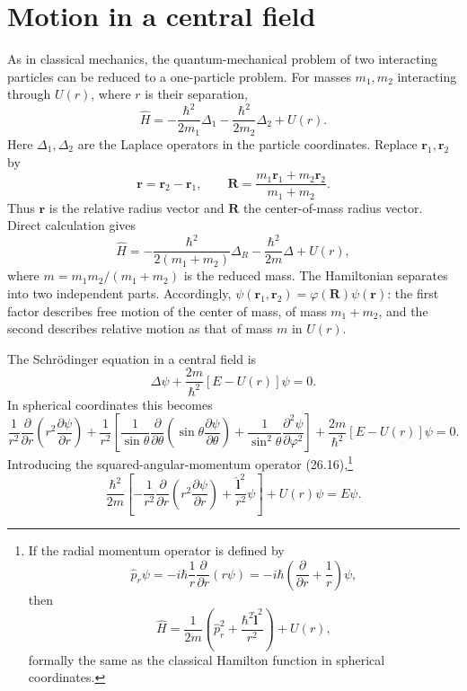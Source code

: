\section{Motion in a central field}

As in classical mechanics, the quantum-mechanical problem of two interacting
particles can be reduced to a one-particle problem. For masses $m_1,m_2$
interacting through $U(r)$, where $r$ is their separation,
\begin{equation}
 \hat H=-\frac{\hbar^2}{2m_1}\Delta_1-\frac{\hbar^2}{2m_2}\Delta_2+U(r).
 \tag{32.1}
\end{equation}
Here $\Delta_1,\Delta_2$ are the Laplace operators in the particle
coordinates. Replace $\mathbf r_1,\mathbf r_2$ by
\begin{equation}
 \mathbf r=\mathbf r_2-\mathbf r_1,\qquad
 \mathbf R=\frac{m_1\mathbf r_1+m_2\mathbf r_2}{m_1+m_2}.
 \tag{32.2}
\end{equation}
Thus $\mathbf r$ is the relative radius vector and $\mathbf R$ the
center-of-mass radius vector. Direct calculation gives
\begin{equation}
 \hat H=-\frac{\hbar^2}{2(m_1+m_2)}\Delta_R-\frac{\hbar^2}{2m}\Delta+U(r),
 \tag{32.3}
\end{equation}
where $m=m_1m_2/(m_1+m_2)$ is the reduced mass. The Hamiltonian separates
into two independent parts. Accordingly,
$\psi(\mathbf r_1,\mathbf r_2)=\varphi(\mathbf R)\psi(\mathbf r)$: the first
factor describes free motion of the center of mass, of mass $m_1+m_2$, and
the second describes relative motion as that of mass $m$ in $U(r)$.

The Schrödinger equation in a central field is
\begin{equation}
 \Delta\psi+\frac{2m}{\hbar^2}[E-U(r)]\psi=0.\tag{32.4}
\end{equation}
In spherical coordinates this becomes
\begin{equation}
 \frac1{r^2}\frac\partial{\partial r}\left(r^2\frac{\partial\psi}{\partial r}\right)
 +\frac1{r^2}\left[\frac1{\sin\theta}\frac\partial{\partial\theta}
 \left(\sin\theta\frac{\partial\psi}{\partial\theta}\right)
 +\frac1{\sin^2\theta}\frac{\partial^2\psi}{\partial\varphi^2}\right]
 +\frac{2m}{\hbar^2}[E-U(r)]\psi=0.\tag{32.5}
\end{equation}
Introducing the squared-angular-momentum operator (26.16),\footnote{If the
radial momentum operator is defined by
\[
 \hat p_r\psi=-i\hbar\frac1r\frac\partial{\partial r}(r\psi)
 =-i\hbar\left(\frac\partial{\partial r}+\frac1r\right)\psi,
\]
then
\[
 \hat H=\frac1{2m}\left(\hat p_r^2+\frac{\hbar^2\hat{\mathbf l}^2}{r^2}\right)+U(r),
\]
formally the same as the classical Hamilton function in spherical
coordinates.}
\begin{equation}
 \frac{\hbar^2}{2m}\left[-\frac1{r^2}\frac\partial{\partial r}
 \left(r^2\frac{\partial\psi}{\partial r}\right)+\frac{\hat{\mathbf l}^2}{r^2}\psi\right]
 +U(r)\psi=E\psi.\tag{32.6}
\end{equation}

